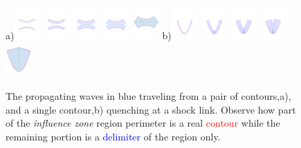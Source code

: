 \begin{figure}[ht]
\centering
a)\includegraphics[width=0.09\textwidth]{figs/two-arc-rays-01.pdf}
\includegraphics[width=0.09\textwidth]{figs/two-arc-rays-03.pdf}
\includegraphics[width=0.09\textwidth]{figs/two-arc-rays-05.pdf}
\includegraphics[width=0.09\textwidth]{figs/two-arc-rays-07.pdf}
\includegraphics[width=0.09\textwidth]{figs/two-arc-rays-final.pdf}
b)\includegraphics[width=0.09\textwidth]{figs/parabola-rays-shocks-01.pdf}
\includegraphics[width=0.09\textwidth]{figs/parabola-rays-shocks-03.pdf}
\includegraphics[width=0.09\textwidth]{figs/parabola-rays-shocks-05.pdf}
\includegraphics[width=0.09\textwidth]{figs/parabola-rays-shocks-08.pdf}
\includegraphics[width=0.09\textwidth]{figs/parabola-rays-shocks-final.pdf}
\caption{The propagating waves in blue traveling from a pair of contours,a), and a single contour,b) quenching at a shock link. Observe how part of the \emph{influence zone} region perimeter is a real \textcolor{red}{contour} while the remaining portion is a \textcolor{blue}{delimiter} of the region only.}
\label{fig:influence_zone}
\end{figure}

